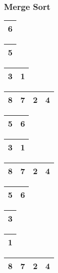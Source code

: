 \begin{frame}
\frametitle{Merge Sort}
\begin{table}
\begin{tabular}{| c |}
\hline
\cellcolor{blue!25}6 \\ 
\hline
\end{tabular}
\quad
\begin{tabular}{| c |}
\hline
\cellcolor{blue!25}5 \\ 
\hline
\end{tabular}
\quad
\begin{tabular}{| c | c |}
\hline
3 & 1 \\ 
\hline
\end{tabular}
\quad
\begin{tabular}{| c | c | c | c |}
\hline
8 & 7 & 2 & 4 \\ 
\hline
\end{tabular}
\end{table}

\begin{table}
\begin{tabular}{| c | c |}
\hline
\cellcolor{blue!25}5 & \cellcolor{blue!25}6 \\ 
\hline
\end{tabular}
\quad
\begin{tabular}{| c | c |}
\hline
3 & 1 \\ 
\hline
\end{tabular}
\quad
\begin{tabular}{| c | c | c | c |}
\hline
8 & 7 & 2 & 4 \\ 
\hline
\end{tabular}
\end{table}

\begin{table}
\begin{tabular}{| c | c |}
\hline
5 & 6 \\ 
\hline
\end{tabular}
\quad
\begin{tabular}{| c |}
\hline
\cellcolor{blue!25}3\\ 
\hline
\end{tabular}
\quad
\begin{tabular}{| c |}
\hline
\cellcolor{blue!25}1 \\ 
\hline
\end{tabular}
\quad
\begin{tabular}{| c | c | c | c |}
\hline
8 & 7 & 2 & 4 \\ 
\hline
\end{tabular}
\end{table}


\end{frame}
